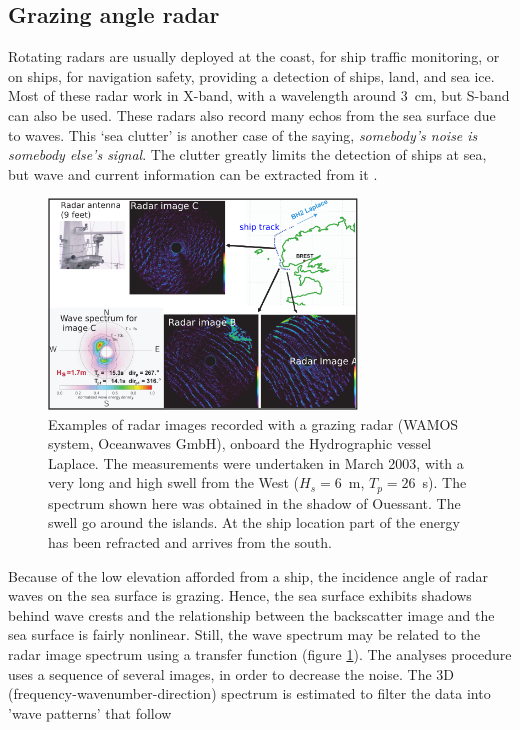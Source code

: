 \subsection{Grazing angle radar}
 Rotating radars are usually deployed at the coast, for ship traffic monitoring, or on ships, for navigation safety, providing a detection of ships, land, and sea ice. 
  Most of these radar work in X-band, with a wavelength around 3~cm, but S-band can also be used. These radars also record many echos from the sea surface due to waves.  This `sea clutter' is another case of the saying, \emph{somebody's noise is somebody else's signal}. 
 The clutter greatly limits the detection of ships at sea, but wave and current information can be extracted from it \citep{Young&al.1985}.
\begin{figure}[htb]
\centerline{\includegraphics[width=0.73\textwidth]{FIGS_CH_MEASUREMENTS/wamos_en.png}}
\caption{Examples of radar images recorded with a grazing radar (WAMOS system, Oceanwaves GmbH), onboard the Hydrographic vessel Laplace. The measurements
were undertaken in March 2003, with a very long and high  swell from the West ($H_{s}=6$~m, $T_{p}=26$~s). The spectrum shown here was obtained in the shadow of Ouessant.
The swell go around the islands. At the ship location part of the energy has been refracted and arrives from the south.}\label{wamosfig}
\end{figure}
 Because of the low elevation afforded from a ship, the incidence angle of radar waves on the sea surface is grazing. Hence, the sea surface exhibits shadows behind wave crests and 
 the relationship between the backscatter image and the sea surface is fairly nonlinear. Still, the wave spectrum may be related to the radar image spectrum using 
 a transfer function (figure \ref{wamosfig}). The analyses procedure uses
a sequence of several images, in order to decrease the noise. The 3D (frequency-wavenumber-direction) spectrum is estimated to filter the data into 'wave patterns'  that follow 
